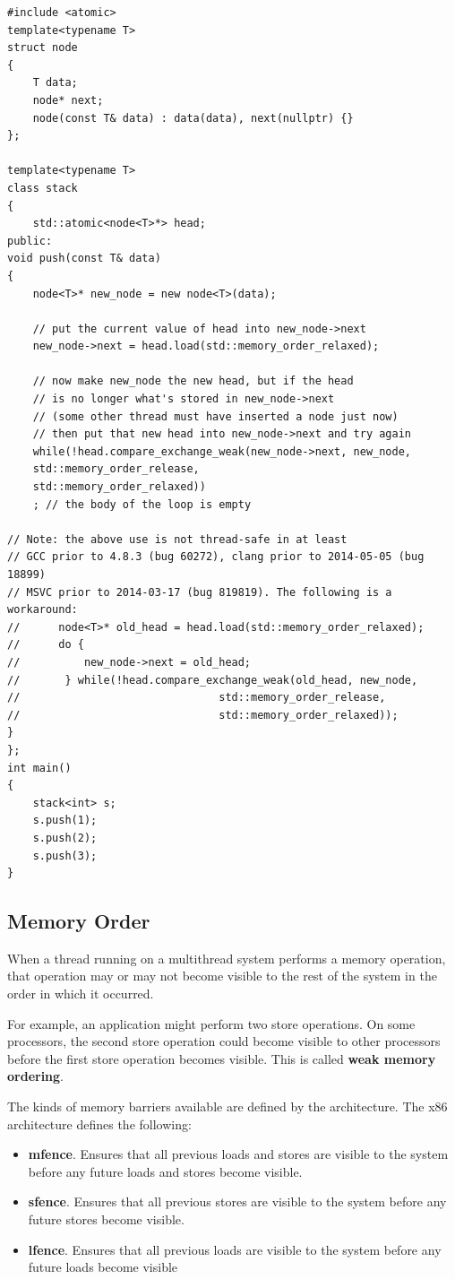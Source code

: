 \documentclass[12pt,a4paper]{report}
\begin{document}
\begin{lstlisting}
#include <atomic>
template<typename T>
struct node
{
	T data;
	node* next;
	node(const T& data) : data(data), next(nullptr) {}
};

template<typename T>
class stack
{
	std::atomic<node<T>*> head;
public:
void push(const T& data)
{
	node<T>* new_node = new node<T>(data);

	// put the current value of head into new_node->next
	new_node->next = head.load(std::memory_order_relaxed);

	// now make new_node the new head, but if the head
	// is no longer what's stored in new_node->next
	// (some other thread must have inserted a node just now)
	// then put that new head into new_node->next and try again
	while(!head.compare_exchange_weak(new_node->next, new_node,
	std::memory_order_release,
	std::memory_order_relaxed))
	; // the body of the loop is empty

// Note: the above use is not thread-safe in at least 
// GCC prior to 4.8.3 (bug 60272), clang prior to 2014-05-05 (bug 18899)
// MSVC prior to 2014-03-17 (bug 819819). The following is a workaround:
//      node<T>* old_head = head.load(std::memory_order_relaxed);
//      do {
//          new_node->next = old_head;
//       } while(!head.compare_exchange_weak(old_head, new_node,
//                               std::memory_order_release,
//                               std::memory_order_relaxed));
}
};
int main()
{
	stack<int> s;
	s.push(1);
	s.push(2);
	s.push(3);
}
\end{lstlisting}
\subsection{Memory Order}
When a thread running on a multithread system performs a memory operation, that operation may or may not become visible to the rest of the system in the order in which it occurred.
\par
For example, an application might perform two store operations. On some processors, the second store operation could become visible to other processors before the first store operation becomes visible. This is called \textbf{weak memory ordering}.
\par
The kinds of memory barriers available are defined by the architecture. The x86 architecture defines the following:
\begin{itemize}
	\item \textbf{mfence}. Ensures that all previous loads and stores are visible to the system before any future loads and stores become visible.
	\item \textbf{sfence}. Ensures that all previous stores are visible to the system before any future stores become visible.
	\item \textbf{lfence}. Ensures that all previous loads are visible to the system before any future loads become visible
\end{itemize}
\end{document}
